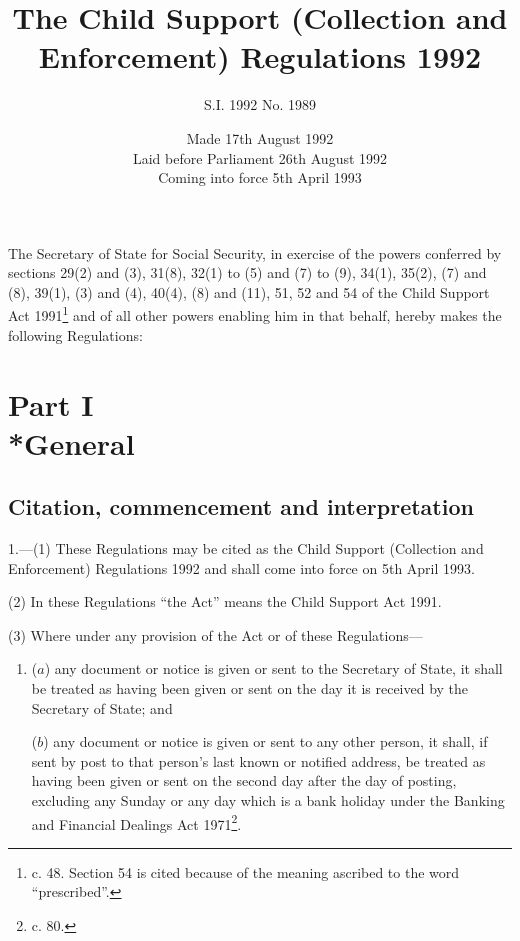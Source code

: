 \documentclass[a4paper]{article}
\title{The Child Support (Collection and Enforcement) Regulations 1992}
\author{S.I. 1992 No. 1989}
\date{Made 17th August 1992\\Laid before Parliament 26th August 1992\\Coming into force 5th April 1993}
\newcommand{\parthead}{}
\begin{document}
\maketitle

\noindent
The Secretary of State for Social Security, in exercise of the powers conferred by sections 29(2) and (3), 31(8), 32(1) to (5) and (7) to (9), 34(1), 35(2), (7) and (8), 39(1), (3) and (4), 40(4), (8) and (11), 51, 52 and 54 of the Child Support Act 1991\footnote{ c. 48. Section 54 is cited because of the meaning ascribed to the word “prescribed”.} and of all other powers enabling him in that behalf, hereby makes the following Regulations:

{\sloppy

\tableofcontents

}

\setcounter{secnumdepth}{-2}

\section[Part I --- General]{Part I\\*General}

\subsection[1. Citation, commencement and interpretation]{Citation, commencement and interpretation}

\renewcommand\parthead{--- Part I}

1.—(1) These Regulations may be cited as the Child Support (Collection and Enforcement) Regulations 1992 and shall come into force on 5th April 1993.

(2) In these Regulations “the Act” means the Child Support Act 1991.

(3) Where under any provision of the Act or of these Regulations—
\begin{enumerate}\item[]
($a$) any document or notice is given or sent to the Secretary of State, it shall be treated as having been given or sent on the day it is received by the Secretary of State; and

($b$) any document or notice is given or sent to any other person, it shall, if sent by post to that person’s last known or notified address, be treated as having been given or sent on the second day after the day of posting, excluding any Sunday or any day which is a bank holiday under the Banking and Financial Dealings Act 1971\footnote{ c. 80.}.
\end{enumerate}
\end{document}
